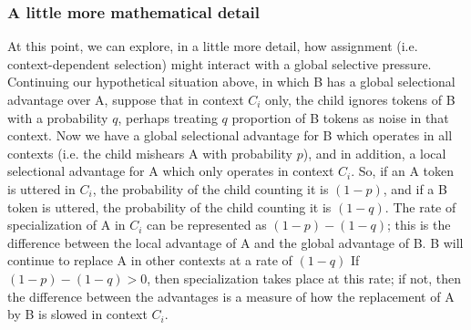 


\subsubsection{A little more mathematical detail}

At this point, we can explore, in a little more detail, how assignment (i.e. context-dependent selection) might interact with a global selective pressure.
Continuing our hypothetical situation above, in which B has a global selectional advantage over A, suppose that in context $C_i$ only, the child ignores tokens of B with a probability $q$, perhaps treating $q$ proportion of B tokens as noise in that context.
Now we have a global selectional advantage for B which operates in all contexts (i.e. the child mishears A with probability $p$), and in addition, a local selectional advantage for A which only operates in context $C_i$.
So, if an A token is uttered in $C_i$, the probability of the child counting it is $(1-p)$, and if a B token is uttered, the probability of the child counting it is $(1-q)$.
The rate of specialization of A in $C_i$ can be represented as $(1-p) - (1-q)$; this is the difference between the local advantage of A and the global advantage of B.
B will continue to replace A in other contexts at a rate of $(1-q)$
If $(1-p) - (1-q) > 0$, then specialization takes place at this rate; if not, then the difference between the advantages is a measure of how the replacement of A by B is slowed in context $C_i$.


